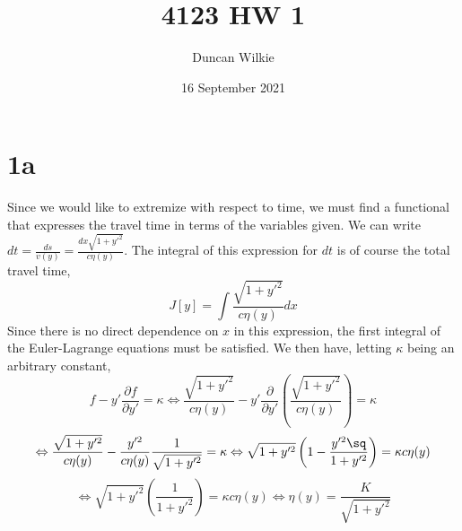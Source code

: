 \documentclass{article}
\title{4123 HW 1}
\author{Duncan Wilkie}
\date{16 September 2021}
\begin{document}
\maketitle

\section*{1a}
Since we would like to extremize with respect to time, we must find a functional that expresses the travel time in terms of the variables given.
We can write $dt = \frac{ds}{v(y)}=\frac{dx\sqrt{1+y'^2}}{c\eta(y)}$.
The integral of this expression for $dt$ is of course the total travel time,\[J[y]  = \int\frac{\sqrt{1+y'^2}}{c\eta(y)}dx\]
Since there is no direct dependence on $x$ in this expression, the first integral of the Euler-Lagrange equations must be satisfied.
We then have, letting $\kappa$ being an arbitrary constant,
\[f-y'\frac{\partial f}{\partial y'} = \kappa\Leftrightarrow \frac{\sqrt{1+y'^2}}{c\eta(y)}-y'\frac{\partial}{\partial y'}\left(\frac{\sqrt{1+y'^2}}{c\eta(y)}\right) = \kappa\]
\[\Leftrightarrow \frac{\sqrt{1+y'^2}}{c\eta(y)}-\frac{y'^2}{c\eta(y)}\frac{1}{\sqrt{1+y'^2}}=\kappa\Leftrightarrow\sqrt{1+y'^2}\left(1-\frac{y'^2\sq}{1+y'^2}\right)=\kappa c\eta(y)\]
\[\Leftrightarrow\sqrt{1+y'^2}\left(\frac{1}{1+y'^2}\right)=\kappa c\eta(y)\Leftrightarrow\eta(y)=\frac{K}{\sqrt{1+y'^2}}\]
\end{document}
